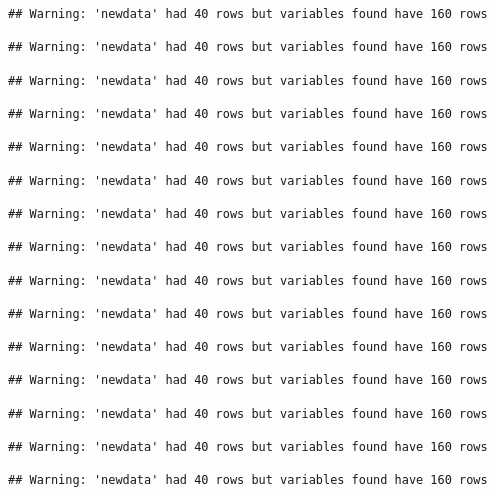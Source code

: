 \documentclass[
]{article}
\begin{document}
\begin{verbatim}
## Warning: 'newdata' had 40 rows but variables found have 160 rows

## Warning: 'newdata' had 40 rows but variables found have 160 rows

## Warning: 'newdata' had 40 rows but variables found have 160 rows

## Warning: 'newdata' had 40 rows but variables found have 160 rows

## Warning: 'newdata' had 40 rows but variables found have 160 rows

## Warning: 'newdata' had 40 rows but variables found have 160 rows

## Warning: 'newdata' had 40 rows but variables found have 160 rows

## Warning: 'newdata' had 40 rows but variables found have 160 rows

## Warning: 'newdata' had 40 rows but variables found have 160 rows

## Warning: 'newdata' had 40 rows but variables found have 160 rows

## Warning: 'newdata' had 40 rows but variables found have 160 rows

## Warning: 'newdata' had 40 rows but variables found have 160 rows

## Warning: 'newdata' had 40 rows but variables found have 160 rows

## Warning: 'newdata' had 40 rows but variables found have 160 rows

## Warning: 'newdata' had 40 rows but variables found have 160 rows
\end{verbatim}
\end{document}
